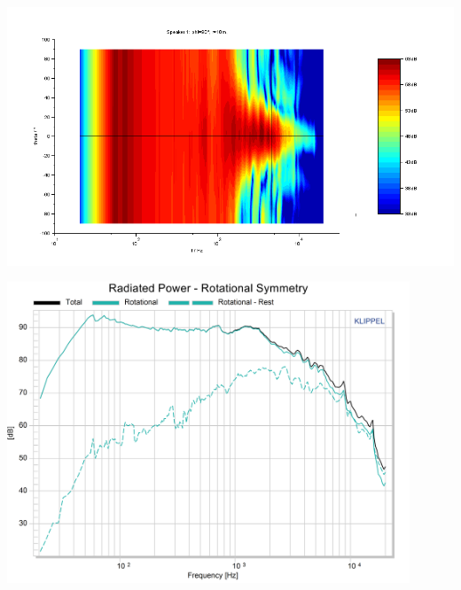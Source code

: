 \documentclass{report}
\begin{document}
\begin{appendices}
\begin{minipage}{0.5\textwidth}
\begin{center}
	\includegraphics[width=\textwidth]{Sym/contour_oval}
    \captionsetup{hypcap=false}
    \label{Curves:oval_contour}
\end{center}
\end{minipage}
\begin{minipage}{0.5\textwidth}
\begin{center}
	\includegraphics[width=0.9\textwidth]{Sym/Oval_RadPow_Rot}
    \captionsetup{hypcap=false}
\end{center}
\end{minipage}


\end{appendices}
\end{document}
